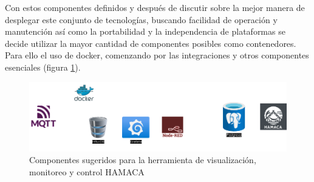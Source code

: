 Con estos componentes definidos y después de discutir sobre la mejor manera de desplegar este conjunto de tecnologías, buscando facilidad de operación y manutención así como la portabilidad y la independencia de plataformas se decide utilizar la mayor cantidad de componentes posibles como contenedores. Para ello el uso de docker\cite{docker}, comenzando por las integraciones y otros componentes esenciales (figura \ref{fig:componentes_hamaca}).\\

\begin{figure}[htb]
\centering
\includegraphics[scale=0.35]{./Figuras/componentes_hamaca.png}
\caption{Componentes sugeridos para la herramienta de visualización, monitoreo y control HAMACA}
\label{fig:componentes_hamaca}
\vspace*{-10pt}
\end{figure}

